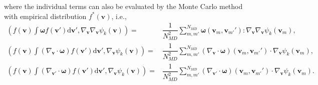 \documentclass[preprint,1p,times]{elsarticle}
\theoremstyle{definition}
\theoremstyle{remark}
\newcommand{\tcr}[1]{\textcolor{black}{#1}}
\begin{document}
where the individual terms can also be evaluated by the Monte Carlo method with empirical distribution $f^{\ast}(\boldsymbol{v})$, i.e., 
\tcr{
\begin{equation}
    \begin{aligned}
        \left( f(\boldsymbol{v})\int \boldsymbol{\omega} f(\boldsymbol{v}')\mathrm{d}\boldsymbol{v}', \nabla_{\boldsymbol{v}} \nabla_{\boldsymbol{v}} \psi_k(\boldsymbol{v}) \right) =&
        \dfrac{1}{N_{MD}^2}\sum_{m,m'}^{N_{MD}} \boldsymbol{\omega}(\boldsymbol{v}_{m},\boldsymbol{v}_{m'} ') : \nabla_{\boldsymbol{v}} \nabla_{\boldsymbol{v}} \psi_k(\boldsymbol{v}_{m}), \\
        \left( f(\boldsymbol{v}) \int (\nabla_{\boldsymbol{v}} \cdot \boldsymbol{\omega}) f(\boldsymbol{v}') \mathrm{d}\boldsymbol{v}', \nabla_{\boldsymbol{v}} \psi_k (\boldsymbol{v}) \right) =&
        \dfrac{1}{N_{MD}^2}\sum_{m,m'}^{N_{MD}} (\nabla_{\boldsymbol{v}} \cdot \boldsymbol{\omega})(\boldsymbol{v}_{m},\boldsymbol{v}_{m'} ') \cdot \nabla_{\boldsymbol{v}} \psi_k (\boldsymbol{v}_{m}), \\
        \left( f(\boldsymbol{v}) \int (\nabla_{\boldsymbol{v}'} \cdot \boldsymbol{\omega}) f(\boldsymbol{v}') \mathrm{d}\boldsymbol{v}', \nabla_{\boldsymbol{v}} \psi_k (\boldsymbol{v}) \right) =&
        \dfrac{1}{N_{MD}^2}\sum_{m,m'}^{N_{MD}} (\nabla_{\boldsymbol{v}'} \cdot \boldsymbol{\omega})(\boldsymbol{v}_{m},\boldsymbol{v}_{m'} ') \cdot \nabla_{\boldsymbol{v}} \psi_k (\boldsymbol{v}_{m}) .
    \end{aligned}
\end{equation}
}
\end{document}
